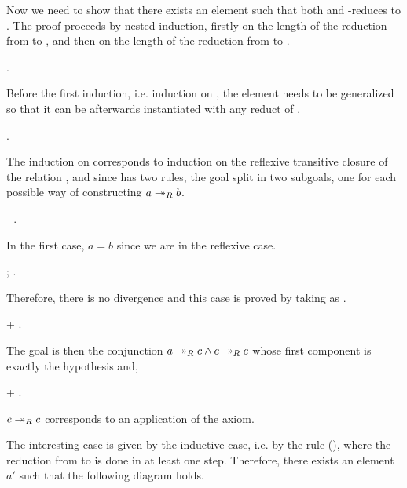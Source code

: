       Now we need to show that there exists an element  such that
      both  and  -reduces to . The proof proceeds by
      nested induction, firstly on the length of the reduction from
       to , and then on the length of the reduction from  to
      . \begin{coqdoccode}
\coqdocemptyline
\coqdocindent{1.00em}
  . \end{coqdoccode}
Before the first induction,
      i.e. induction on , the element  needs to be
      generalized so that it can be afterwards instantiated with any
      reduct of . \begin{coqdoccode}
\coqdocemptyline
\coqdocindent{1.00em}
 . \end{coqdoccode}
The induction on  corresponds to
       induction on the reflexive transitive closure of the relation
       , and since  has two rules, the goal split in two
       subgoals, one for each possible way of constructing $a \twoheadrightarrow_R
       b$. \begin{coqdoccode}
\coqdocemptyline
\coqdocindent{1.00em}
-   . \end{coqdoccode}
In the first case, $a = b$ since we are in
    the reflexive case. \begin{coqdoccode}
\coqdocemptyline
\coqdocindent{2.00em}
\coqdoctac{\ensuremath{\exists}} ; . \end{coqdoccode}
Therefore, there is no divergence and this case is
      proved by taking  as . \begin{coqdoccode}
\coqdocemptyline
\coqdocindent{2.00em}
+ . \end{coqdoccode}
The goal is then the conjunction $a\twoheadrightarrow_R c
        \land c \twoheadrightarrow_R c$ whose first component is exactly the
        hypothesis  and, \begin{coqdoccode}
\coqdocemptyline
\coqdocindent{2.00em}
+  . \end{coqdoccode}
$c \twoheadrightarrow_R c$ corresponds to an application of
        the  axiom.


        The interesting case is given by the inductive case, i.e. by
        the rule (), where the reduction from  to  is
        done in at least one step. Therefore, there exists an element
        $a'$ such that the following diagram holds.


